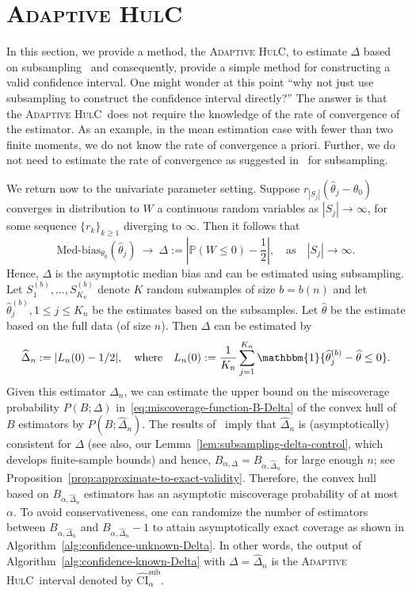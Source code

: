 \documentclass{article}
\newcommand{\ahulc}{\textsc{Adaptive HulC}~}
\newcommand{\ahulcnospace}{\textsc{Adaptive HulC}}
\numberwithin{myalgctr}{section}
\begin{document}
\section{\ahulcnospace}\label{sec:adaptive-convex-hull}
In this section, we provide a method, the \ahulcnospace, to estimate $\Delta$ based on subsampling~\citep{politis1994large} and consequently, provide a simple method for constructing a valid confidence interval. One might wonder at this point ``why not just use subsampling to construct the confidence interval directly?'' The answer is that the \ahulc does not require the knowledge of the rate of convergence of the estimator. As an example, in the mean estimation case with fewer than two finite moments, we do not know the rate of convergence a priori. Further, we do not need to estimate the rate of convergence as suggested in~\cite{bertail1999subsampling} for subsampling. 

We return now to the univariate parameter setting. Suppose $r_{|S_j|}(\widehat{\theta}_j - \theta_0)$ converges in distribution to $W$ a continuous random variables as $|S_j|\to\infty${\color{black}, for some sequence $\{r_k\}_{k\ge1}$ diverging to $\infty$}. Then it follows that
\[
\mbox{Med-bias}_{\theta_0}(\widehat{\theta}_j) ~\to~ \Delta := \left|\mathbb{P}(W \le 0) - \frac{1}{2}\right|,\quad\mbox{as}\quad |S_j|\to\infty.
\]
Hence, $\Delta$ is the asymptotic median bias and can be estimated using subsampling. Let $S_1^{(b)}, \ldots, S_{K_n}^{(b)}$ denote $K$ random subsamples of size $b = b(n)$ and let $\widehat{\theta}_j^{(b)}, 1\le j\le K_n$ be the estimates based on the subsamples. Let $\widehat{\theta}$ be the estimate based on the full data (of size $n$). Then $\Delta$ can be estimated by
\begin{equation}\label{eq:subsampling-median-bias-distribution}
\widehat{\Delta}_n := |L_n(0) - 1/2|,\quad\mbox{where}\quad L_n(0) := \frac{1}{K_n}\sum_{j=1}^{K_n}\mathbbm{1}\{\widehat{\theta}_j^{(b)} - \widehat{\theta} \le 0\}.
\end{equation}
Given this estimator $\widehat{\Delta}_n$, we can estimate the {\color{black}upper bound on the} miscoverage probability $P(B; \Delta)$ in~\eqref{eq:miscoverage-function-B-Delta} of the convex hull of $B$ estimators by $P(B; \widehat{\Delta}_n)$. 
The results of~\cite{politis1994large} imply that $\widehat{\Delta}_n$ is (asymptotically) consistent for $\Delta$ (see also, our Lemma~\ref{lem:subsampling-delta-control}, which develops finite-sample bounds)
and hence, $B_{\alpha,\Delta} = B_{\alpha,\widehat{\Delta}_n}$ for large enough $n$; see Proposition~\ref{prop:approximate-to-exact-validity}. Therefore, the convex hull based on $B_{\alpha,\widehat{\Delta}_n}$ estimators has an asymptotic miscoverage probability of at most $\alpha$. To avoid conservativeness, one can randomize the number of estimators between $B_{\alpha,\widehat{\Delta}_n}$ and $B_{\alpha,\widehat{\Delta}_n} - 1$ to attain asymptotically exact coverage as shown in Algorithm~\ref{alg:confidence-unknown-Delta}. {\color{black}In other words, the output of Algorithm~\ref{alg:confidence-known-Delta} with $\Delta = \widehat{\Delta}_n$ is the \ahulc interval denoted by $\widehat{\mathrm{CI}}_{\alpha}^{\mathrm{sub}}.$}
\end{document}
